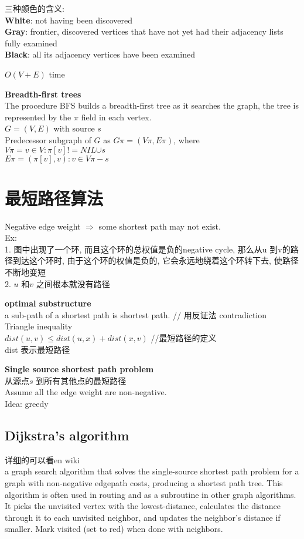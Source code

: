 \documentclass{article}
\begin{document}
\bigskip
三种颜色的含义:\\
\textbf{White}: not having been discovered\\
\textbf{Gray}: frontier, discovered vertices that have not yet had their adjacency lists fully examined\\
\textbf{Black}: all its adjacency vertices have been examined

\noindent
$O(V+E)$ time

\bigskip
\textbf{Breadth-first trees}\\
The procedure BFS builds a breadth-first tree as it searches the graph, the tree is represented by the $\pi$ field in each vertex.\\
$G=(V, E)$ with source $s$\\
Predecessor subgraph of $G$ as $G\pi = (V\pi, E\pi)$, where\\
$V\pi = {v \in V: \pi[v] != NIL} {\cup s}$\\
$E\pi = {(\pi[v], v) : v \in V\pi - {s}}$

\section{最短路径算法}
Negative edge weight $\Rightarrow$ some shortest path may not exist.\\
Ex:\\
1.	图中出现了一个环, 而且这个环的总权值是负的negative cycle, 那么从u 到v的路径到达这个环时, 由于这个环的权值是负的, 它会永远地绕着这个环转下去, 使路径不断地变短\\
2.	$u$ 和$v$ 之间根本就没有路径

\textbf{optimal substructure}\\
a sub-path of a shortest path is shortest path.  // 用反证法 contradiction\\
Triangle inequality\\
$dist(u,v) \leq dist(u,x) + dist(x,v)$ //最短路径的定义\\
dist 表示最短路径

\textbf{Single source shortest path problem}\\
从源点$s$ 到所有其他点的最短路径\\
Assume all the edge weight are non-negative.\\
Idea: greedy

\subsection{Dijkstra's algorithm}
详细的可以看en wiki\\
a graph search algorithm that solves the single-source shortest path problem for a graph with non-negative edgepath costs, producing a shortest path tree. This algorithm is often used in routing and as a subroutine in other graph algorithms.\\
It picks the unvisited vertex with the lowest-distance, calculates the distance through it to each unvisited neighbor, and updates the neighbor's distance if smaller. Mark visited (set to red) when done with neighbors.
\end{document}
